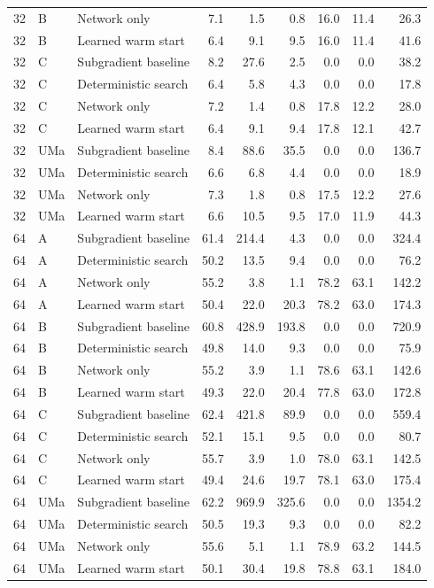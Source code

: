 \documentclass[10pt,letterpaper]{article}
\begin{document}
\begin{longtable}{rllrrrrrr}
32 & B & Network only & 7.1 & 1.5 & 0.8 & 16.0 & 11.4 & 26.3\\
32 & B & Learned warm start & 6.4 & 9.1 & 9.5 & 16.0 & 11.4 & 41.6\\
32 & C & Subgradient baseline & 8.2 & 27.6 & 2.5 & 0.0 & 0.0 & 38.2\\
32 & C & Deterministic search & 6.4 & 5.8 & 4.3 & 0.0 & 0.0 & 17.8\\
32 & C & Network only & 7.2 & 1.4 & 0.8 & 17.8 & 12.2 & 28.0\\
32 & C & Learned warm start & 6.4 & 9.1 & 9.4 & 17.8 & 12.1 & 42.7\\
32 & UMa & Subgradient baseline & 8.4 & 88.6 & 35.5 & 0.0 & 0.0 & 136.7\\
32 & UMa & Deterministic search & 6.6 & 6.8 & 4.4 & 0.0 & 0.0 & 18.9\\
32 & UMa & Network only & 7.3 & 1.8 & 0.8 & 17.5 & 12.2 & 27.6\\
32 & UMa & Learned warm start & 6.6 & 10.5 & 9.5 & 17.0 & 11.9 & 44.3\\
64 & A & Subgradient baseline & 61.4 & 214.4 & 4.3 & 0.0 & 0.0 & 324.4\\
64 & A & Deterministic search & 50.2 & 13.5 & 9.4 & 0.0 & 0.0 & 76.2\\
64 & A & Network only & 55.2 & 3.8 & 1.1 & 78.2 & 63.1 & 142.2\\
64 & A & Learned warm start & 50.4 & 22.0 & 20.3 & 78.2 & 63.0 & 174.3\\
64 & B & Subgradient baseline & 60.8 & 428.9 & 193.8 & 0.0 & 0.0 & 720.9\\
64 & B & Deterministic search & 49.8 & 14.0 & 9.3 & 0.0 & 0.0 & 75.9\\
64 & B & Network only & 55.2 & 3.9 & 1.1 & 78.6 & 63.1 & 142.6\\
64 & B & Learned warm start & 49.3 & 22.0 & 20.4 & 77.8 & 63.0 & 172.8\\
64 & C & Subgradient baseline & 62.4 & 421.8 & 89.9 & 0.0 & 0.0 & 559.4\\
64 & C & Deterministic search & 52.1 & 15.1 & 9.5 & 0.0 & 0.0 & 80.7\\
64 & C & Network only & 55.7 & 3.9 & 1.0 & 78.0 & 63.1 & 142.5\\
64 & C & Learned warm start & 49.4 & 24.6 & 19.7 & 78.1 & 63.0 & 175.4\\
64 & UMa & Subgradient baseline & 62.2 & 969.9 & 325.6 & 0.0 & 0.0 & 1354.2\\
64 & UMa & Deterministic search & 50.5 & 19.3 & 9.3 & 0.0 & 0.0 & 82.2\\
64 & UMa & Network only & 55.6 & 5.1 & 1.1 & 78.9 & 63.2 & 144.5\\
64 & UMa & Learned warm start & 50.1 & 30.4 & 19.8 & 78.8 & 63.1 & 184.0\\\end{longtable}\endgroup\setcounter{table}{\DIFsavedtable}\endgroup
\end{document}
